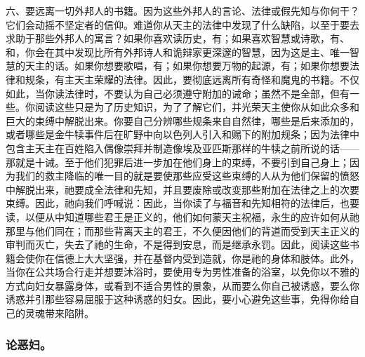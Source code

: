六、要远离一切外邦人的书籍。因为这些外邦人的言论、法律或假先知与你何干？它们会动摇不坚定者的信仰。难道你从天主的法律中发现了什么缺陷，以至于要去求助于那些外邦人的寓言？如果你喜欢读历史，有；如果喜欢智慧或诗歌，有、和，你会在其中发现比所有外邦诗人和诡辩家更深邃的智慧，因为这是主、唯一智慧的天主的话。如果你想要歌唱，有；如果你想要万物的起源，有；如果你想要法律和规条，有主天主荣耀的法律。因此，要彻底远离所有奇怪和魔鬼的书籍。不仅如此，当你读法律时，不要认为自己必须遵守附加的诫命；虽然不是全部，但有一些。你阅读这些只是为了历史知识，为了了解它们，并光荣天主使你从如此众多和巨大的束缚中解脱出来。你要自己分辨哪些规条来自自然律，哪些是后来添加的，或者哪些是金牛犊事件后在旷野中向以色列人引入和赐下的附加规条；因为法律中包含主天主在百姓陷入偶像崇拜并制造像埃及亚匹斯那样的牛犊之前所说的话——那就是十诫。至于他们犯罪后进一步加在他们身上的束缚，不要引到自己身上；因为我们的救主降临的唯一目的就是要使那些应受这些束缚的人从为他们保留的愤怒中解脱出来，祂要成全法律和先知，并且要废除或改变那些附加在法律之上的次要束缚。因此，祂向我们呼喊说：因此，当你读了与福音和先知相符的法律后，也要读，以便从中知道哪些君王是正义的，他们如何蒙天主祝福，永生的应许如何从祂那里与他们同在；而那些背离天主的君王，不久便因他们的背道而受到天主正义的审判而灭亡，失去了祂的生命，不是得到安息，而是继承永罚。因此，阅读这些书籍会使你在信德上大大坚强，并在基督内受到造就，你是祂的身体和肢体。此外，当你在公共场合行走并想要沐浴时，要使用专为男性准备的浴室，以免你以不雅的方式向妇女暴露身体，或看到不适合男性的景象，从而要么你自己被诱惑，要么你诱惑并引那些容易屈服于这种诱惑的妇女。因此，要小心避免这些事，免得你给自己的灵魂带来陷阱。\par


\subsubsection{论恶妇。}

